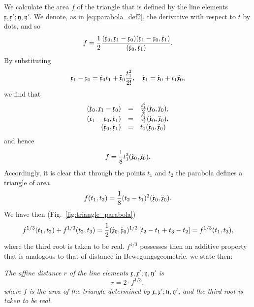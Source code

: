 \documentclass[11pt]{book} \usepackage{amssymb}
\newcommand{\myvec}[1]{\mathfrak{#1}}
\newcommand{\vecx}{\myvec{x}}
\newcommand{\vecy}{\myvec{y}}
\newcommand{\vecderiv}[1]{\dot{\myvec{#1}}}
\newcommand{\vecderivv}[1]{\ddot{\myvec{#1}}}
\begin{document}
We calculate the area $f$ of the triangle that is defined by the line elements
$\vecx,\vecx';\vecy,\vecy'$. We denote, as in 
\eqref{eq:parabola_def2}, the derivative with respect to $t$ by dots,
and so
\begin{equation}
  \label{eq:triangle_area_vector}
  f={1\over 2}{(\vecderiv{x}_0,\vecx_1-\vecx_0)(\vecx_1-\vecx_0,\vecderiv{x}_1)
    \over (\vecderiv{x}_0,\vecderiv{x}_1)}.
\end{equation}
By substituting 
\begin{equation*} 
  \vecx_1-\vecx_0=\vecderiv{x}_0t_1+\vecderivv{x}_0{t_1^2\over 2!},\quad \vecderiv{x}_1=\vecderiv{x}_0+t_1\vecderivv{x}_0,
\end{equation*}
we find that
\begin{equation*}
  \begin{array}{rcl}
    (\vecderiv{x}_0,\vecx_1-\vecx_0)&=&{t_1^2\over 2}(\vecderiv{x}_0,\vecderivv{x}_0),\\
    (\vecx_1-\vecx_0,\vecderiv{x}_1)&=&{t_1^2\over 2}(\vecderiv{x}_0,\vecderivv{x}_0),\\
    (\vecderiv{x}_0,\vecderiv{x}_1)&=&t_1(\vecderiv{x}_0,\vecderivv{x}_0)
  \end{array}
\end{equation*}
and hence
\begin{equation}
  \label{eq:triangle_area_parabola}
  f={1\over 8}t_1^3(\vecderiv{x}_0,\vecderivv{x}_0).
\end{equation}
Accordingly, it is clear that through the points $t_1$ and $t_2$ the parabola
defines a triangle of area
\begin{equation}
  \label{eq:parabola_defines_area}
  f(t_1,t_2)={1\over 8}(t_2-t_1)^3(\vecderiv{x}_0,\vecderivv{x}_0).
\end{equation}
We have then (Fig.~\ref{fig:triangle_parabola})
\begin{equation}
  \label{eq:affine_distance_additive}
  f^{1/3}(t_1,t_2)+f^{1/3}(t_2,t_3)={1\over 2}(\vecderiv{x}_0,\vecderivv{x}_0)^{1/3}\left[t_2-t_1+t_3-t_2\right]=f^{1/3}(t_1,t_3),
\end{equation}
where the third root is taken to be real. $f^{1/3}$ possesses then an 
additive property that is analogous to that of distance in Bewegungsgeometrie. 
we state then:

{\em The affine distance $r$ of the line elements 
$\vecx,\vecx';\vecy,\vecy'$ is 
$$r=2\cdot f^{1/3},$$
where $f$ is the area of the triangle determined by 
$\vecx,\vecx';\vecy,\vecy'$, and the third root is taken to be
real.}
\end{document}
